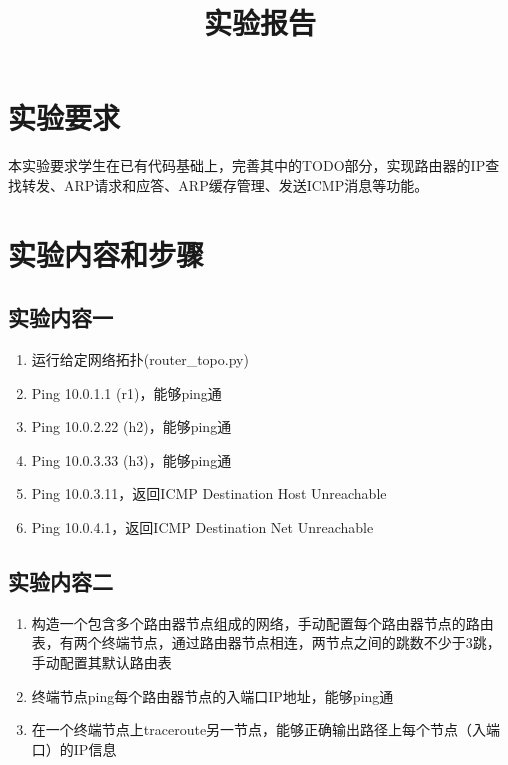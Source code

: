 \documentclass{zjureport}
\title{实验报告}
\date{\zhtoday}
\begin{document}
\makecover
\makeheader


\section{实验要求}
  本实验要求学生在已有代码基础上，完善其中的TODO部分，实现路由器的IP查找转发、ARP请求和应答、ARP缓存管理、发送ICMP消息等功能。
\section{实验内容和步骤}

  \subsection{实验内容一}

      \begin{enumerate}
          \item 运行给定网络拓扑(router\_topo.py)
          \item Ping 10.0.1.1 (r1)，能够ping通
          \item Ping 10.0.2.22 (h2)，能够ping通
          \item Ping 10.0.3.33 (h3)，能够ping通
          \item Ping 10.0.3.11，返回ICMP Destination Host Unreachable
          \item Ping 10.0.4.1，返回ICMP Destination Net Unreachable
      \end{enumerate}

  \subsection{实验内容二}


      \begin{enumerate}
          \item 构造一个包含多个路由器节点组成的网络，手动配置每个路由器节点的路由表，有两个终端节点，通过路由器节点相连，两节点之间的跳数不少于3跳，手动配置其默认路由表
          \item 终端节点ping每个路由器节点的入端口IP地址，能够ping通
          \item 在一个终端节点上traceroute另一节点，能够正确输出路径上每个节点（入端口）的IP信息
      \end{enumerate}
\end{document}
